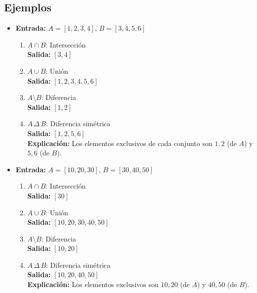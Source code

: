 \begin{enumerate}
    \subsection*{Ejemplos}
    \begin{itemize}
        \item \textbf{Entrada:} \( A = [1, 2, 3, 4] \), \( B = [3, 4, 5, 6] \)
        \begin{enumerate}
            \item \( A \cap B \): Intersección\\
            \textbf{Salida:} \([3, 4]\)
    
            \item \( A \cup B \): Unión\\
            \textbf{Salida:} \([1, 2, 3, 4, 5, 6]\)
    
            \item \( A \setminus B \): Diferencia\\
            \textbf{Salida:} \([1, 2]\)
    
            \item \( A \, \Delta \, B \): Diferencia simétrica\\
            \textbf{Salida:} \([1, 2, 5, 6]\)\\
            \textbf{Explicación:} Los elementos exclusivos de cada conjunto son \(1, 2\) (de \(A\)) y \(5, 6\) (de \(B\)).
        \end{enumerate}
    
        \item \textbf{Entrada:} \( A = [10, 20, 30] \), \( B = [30, 40, 50] \)
        \begin{enumerate}
            \item \( A \cap B \): Intersección\\
            \textbf{Salida:} \([30]\)
    
            \item \( A \cup B \): Unión\\
            \textbf{Salida:} \([10, 20, 30, 40, 50]\)
    
            \item \( A \setminus B \): Diferencia\\
            \textbf{Salida:} \([10, 20]\)
    
            \item \( A \, \Delta \, B \): Diferencia simétrica\\
            \textbf{Salida:} \([10, 20, 40, 50]\)\\
            \textbf{Explicación:} Los elementos exclusivos son \(10, 20\) (de \(A\)) y \(40, 50\) (de \(B\)).
        \end{enumerate}
    

\end{itemize}
\end{enumerate}
